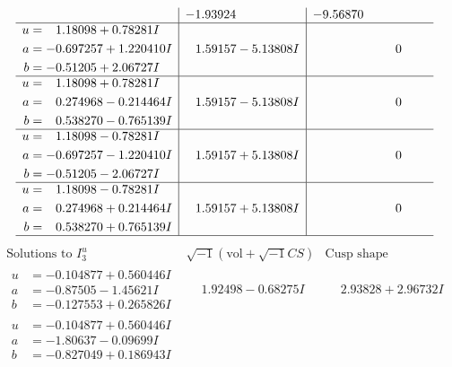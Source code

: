 \documentclass[1p]{elsarticle_modified}
\theoremstyle{definition}
\newcommand{\I}{\sqrt{-1}}
\begin{document}
$$\begin{array}{c|c|c}
 & -1.93924\phantom{ +0.000000I} & -9.56870\phantom{ +0.000000I} \\ \hline\begin{aligned}
u &= \phantom{-}1.18098 + 0.78281 I \\
a &= -0.697257 + 1.220410 I \\
b &= -0.51205 + 2.06727 I\end{aligned}
 & \phantom{-}1.59157 - 5.13808 I & \phantom{-0.000000 } 0 \\ \hline\begin{aligned}
u &= \phantom{-}1.18098 + 0.78281 I \\
a &= \phantom{-}0.274968 - 0.214464 I \\
b &= \phantom{-}0.538270 - 0.765139 I\end{aligned}
 & \phantom{-}1.59157 - 5.13808 I & \phantom{-0.000000 } 0 \\ \hline\begin{aligned}
u &= \phantom{-}1.18098 - 0.78281 I \\
a &= -0.697257 - 1.220410 I \\
b &= -0.51205 - 2.06727 I\end{aligned}
 & \phantom{-}1.59157 + 5.13808 I & \phantom{-0.000000 } 0 \\ \hline\begin{aligned}
u &= \phantom{-}1.18098 - 0.78281 I \\
a &= \phantom{-}0.274968 + 0.214464 I \\
b &= \phantom{-}0.538270 + 0.765139 I\end{aligned}
 & \phantom{-}1.59157 + 5.13808 I & \phantom{-0.000000 } 0\\
 \hline 
 \end{array}$$\newpage$$\begin{array}{c|c|c}  
\text{Solutions to }I^u_{3}& \I (\text{vol} + \sqrt{-1}CS) & \text{Cusp shape}\\
 \hline 
\begin{aligned}
u &= -0.104877 + 0.560446 I \\
a &= -0.87505 - 1.45621 I \\
b &= -0.127553 + 0.265826 I\end{aligned}
 & \phantom{-}1.92498 - 0.68275 I & \phantom{-}2.93828 + 2.96732 I \\ \hline\begin{aligned}
u &= -0.104877 + 0.560446 I \\
a &= -1.80637 - 0.09699 I \\
b &= -0.827049 + 0.186943 I\end{aligned}

\end{array}$$
\end{document}
